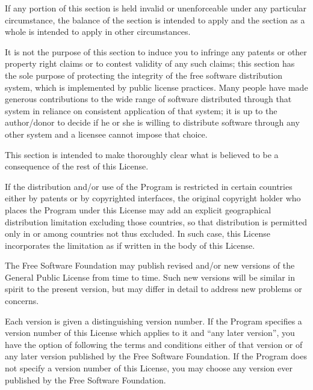 \begin{lrbox}{\gpl}
\begin{minipage}{3\textwidth}
      If any portion of this section is held invalid or unenforceable
      under any particular circumstance, the balance of the section is
      intended to apply and the section as a whole is intended to apply
      in other circumstances.

      It is not the purpose of this section to induce you to infringe
      any patents or other property right claims or to contest validity
      of any such claims; this section has the sole purpose of
      protecting the integrity of the free software distribution
      system, which is implemented by public license practices.  Many
      people have made generous contributions to the wide range of
      software distributed through that system in reliance on
      consistent application of that system; it is up to the
      author/donor to decide if he or she is willing to distribute
      software through any other system and a licensee cannot impose
      that choice.

      This section is intended to make thoroughly clear what is
      believed to be a consequence of the rest of this License.

\item If the distribution and/or use of the Program is restricted in
      certain countries either by patents or by copyrighted interfaces,
      the original copyright holder who places the Program under this
      License may add an explicit geographical distribution limitation
      excluding those countries, so that distribution is permitted only
      in or among countries not thus excluded.  In such case, this
      License incorporates the limitation as if written in the body of
      this License.

\item The Free Software Foundation may publish revised and/or new
      versions of the General Public License from time to time.  Such
      new versions will be similar in spirit to the present version,
      but may differ in detail to address new problems or concerns.

      Each version is given a distinguishing version number.  If the
      Program specifies a version number of this License which applies
      to it and ``any later version'', you have the option of following
      the terms and conditions either of that version or of any later
      version published by the Free Software Foundation.  If the
      Program does not specify a version number of this License, you
      may choose any version ever published by the Free Software
      Foundation.


\end{minipage}
\end{lrbox}
